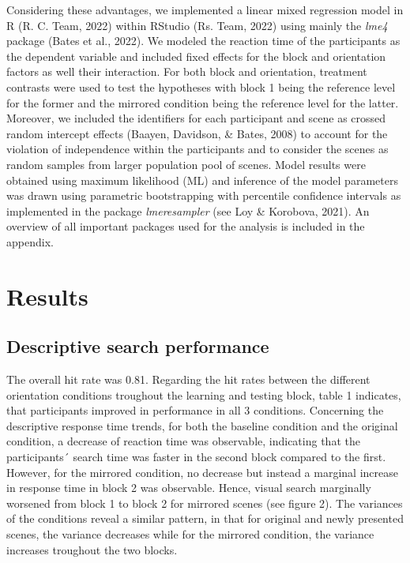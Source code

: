 \documentclass[
  man,floatsintext]{apa7}
\begin{document}
Considering these advantages, we implemented a linear mixed regression model in R (R. C. Team, 2022) within RStudio (Rs. Team, 2022) using mainly the \emph{lme4} package (Bates et al., 2022). We modeled the reaction time of the participants as the dependent variable and included fixed effects for the block and orientation factors as well their interaction. For both block and orientation, treatment contrasts were used to test the hypotheses with block 1 being the reference level for the former and the mirrored condition being the reference level for the latter. Moreover, we included the identifiers for each participant and scene as crossed random intercept effects (Baayen, Davidson, \& Bates, 2008) to account for the violation of independence within the participants and to consider the scenes as random samples from larger population pool of scenes. Model results were obtained using maximum likelihood (ML) and inference of the model parameters was drawn using parametric bootstrapping with percentile confidence intervals as implemented in the package \emph{lmeresampler} (see Loy \& Korobova, 2021). An overview of all important packages used for the analysis is included in the appendix.

\hypertarget{results}{%
\section{Results}\label{results}}

\hypertarget{descriptive-search-performance}{%
\subsection{Descriptive search performance}\label{descriptive-search-performance}}

The overall hit rate was 0.81. Regarding the hit rates between the different orientation conditions troughout the learning and testing block, table 1 indicates, that participants improved in performance in all 3 conditions. Concerning the descriptive response time trends, for both the baseline condition and the original condition, a decrease of reaction time was observable, indicating that the participants´ search time was faster in the second block compared to the first. However, for the mirrored condition, no decrease but instead a marginal increase in response time in block 2 was observable. Hence, visual search marginally worsened from block 1 to block 2 for mirrored scenes (see figure 2). The variances of the conditions reveal a similar pattern, in that for original and newly presented scenes, the variance decreases while for the mirrored condition, the variance increases troughout the two blocks.
\end{document}
